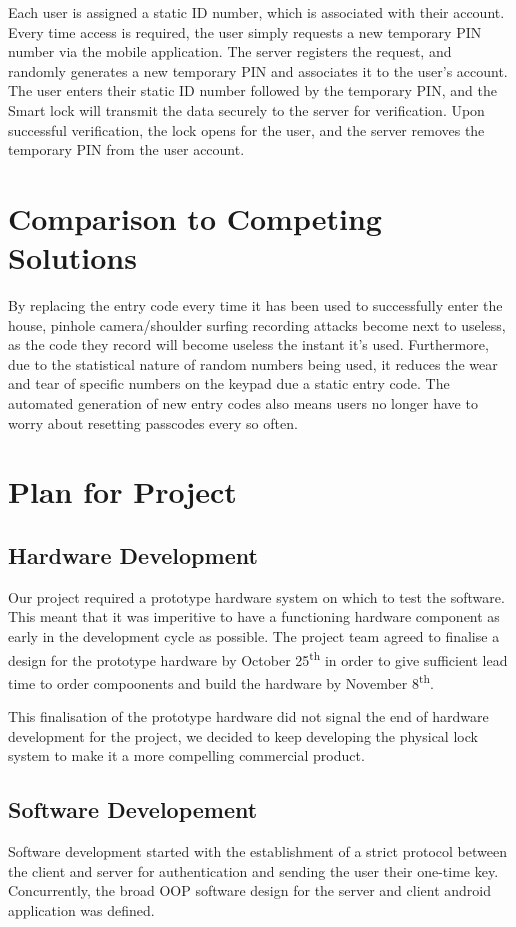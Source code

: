 \documentclass[conference]{IEEEtran}
\begin{document}
Each user is assigned a static ID number, which is associated with their account. Every time access is required, the user simply requests a new temporary PIN number via the mobile application. The server registers the request, and randomly generates a new temporary PIN and associates it to the user's account. The user enters their static ID number followed by the temporary PIN, and the Smart lock will transmit the data securely to the server for verification. Upon successful verification, the lock opens for the user, and the server removes the temporary PIN from the user account.

\section{Comparison to Competing Solutions}
By replacing the entry code every time it has been used to successfully enter the house, pinhole camera/shoulder surfing recording attacks become next to useless, as the code they record will become useless the instant it’s used. Furthermore, due to the statistical nature of random numbers being used, it reduces the wear and tear of specific numbers on the keypad due a static entry code. The automated generation of new entry codes also means users no longer have to worry about resetting passcodes every so often.

\section{Plan for Project}
\subsection{Hardware Development}
	Our project required a prototype hardware system on which to test the software. This meant that it was imperitive to have a functioning hardware component as early in the development cycle as possible. The project team agreed to finalise a design for the prototype hardware by October 25\textsuperscript{th} in order to give sufficient lead time to order compoonents and build the hardware by November 8\textsuperscript{th}.


	This finalisation of the prototype hardware did not signal the end of hardware development for the project, we decided to keep developing the physical lock system to make it a more compelling commercial product.

\subsection{Software Developement}
	Software development started with the establishment of a strict protocol between the client and server for authentication and sending the user their one-time key. Concurrently, the broad OOP software design for the server and client android application was defined.
\end{document}
